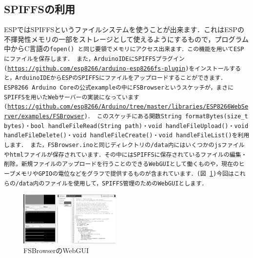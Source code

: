 \subsection{SPIFFSの利用}
ESPではSPIFFSというファイルシステムを使うことが出来ます．これはESPの不揮発性メモリの一部をストレージとして使えるようにするもので，プログラム中からC言語の\tt{fopen()}\rm{} と同じ要領でメモリにアクセス出来ます．この機能を用いてESPにファイルを保存します．
また，ArduinoIDEにSPIFFSプラグイン(\url{https://github.com/esp8266/arduino-esp8266fs-plugin})をインストールすると，ArduinoIDEからESPのSPIFFSにファイルをアップロードすることができます．
ESP8266 Arduino Coreの公式exampleの中にFSBrowserというスケッチが，まさにSPIFFSを用いたWebサーバーの実装になっています(\url{https://github.com/esp8266/Arduino/tree/master/libraries/ESP8266WebServer/examples/FSBrowser})．
このスケッチにある関数\tt{String formatBytes(size\_t bytes)}\rm{}・\tt{bool handleFileRead(String path)}\rm{}・\tt{void handleFileUpload()}\rm{}・\tt{void handleFileDelete()}\rm{}・\tt{void  handleFileCreate()}\rm{}・\tt{void  handleFileList()}\rm{}を利用します．
また，FSBrowser.inoと同じディレクトリの\tt{/data}\rm{}内にはいくつかのjsファイルやhtmlファイルが保存されています．その中にはSPIFFSに保存されているファイルの編集・削除，新規ファイルのアップロードを行うことのできるWebGUIとして働くものや，現在のヒープメモリやGPIOの電位などをグラフで提供するものが含まれています．(図 \ref{fig:fsb})今回はこれらの\tt{/data}\rm{}内のファイルを使用して，SPIFFS管理のためのWebGUIとします．

\begin{figure}[htbp]
    \centering
    \includegraphics[width=50mm]{./assets/sample-haibaraasset/FSBrowser.png}
    \caption{FSBrowserのWebGUI}
    \label{fig:fsb}
\end{figure}

